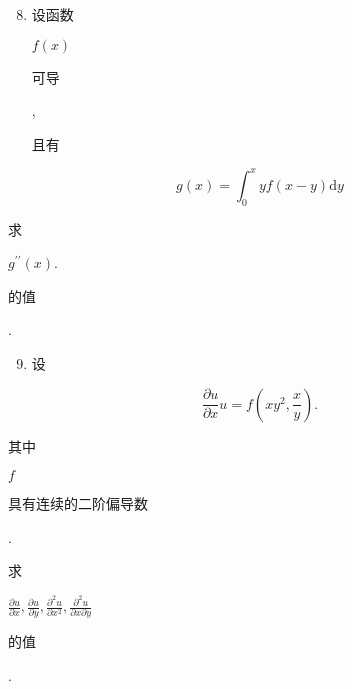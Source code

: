 \documentclass[10pt]{article}
\begin{document}
\begin{enumerate}
  \setcounter{enumi}{7}
  \item \begin{CJK}{UTF8}{mj}设函数\end{CJK} $f(x)$ \begin{CJK}{UTF8}{mj}可导\end{CJK}, \begin{CJK}{UTF8}{mj}且有\end{CJK}
\end{enumerate}
$$
g(x)=\int_{0}^{x} y f(x-y) \mathrm{d} y
$$
\begin{CJK}{UTF8}{mj}求\end{CJK} $g^{\prime \prime}(x)$. \begin{CJK}{UTF8}{mj}的值\end{CJK}.

\begin{enumerate}
  \setcounter{enumi}{8}
  \item \begin{CJK}{UTF8}{mj}设\end{CJK}
\end{enumerate}
$$
\frac{\partial u}{\partial x} u=f\left(x y^{2}, \frac{x}{y}\right) .
$$
\begin{CJK}{UTF8}{mj}其中\end{CJK} $f$ \begin{CJK}{UTF8}{mj}具有连续的二阶偏导数\end{CJK}. \begin{CJK}{UTF8}{mj}求\end{CJK} $\frac{\partial u}{\partial x}, \frac{\partial u}{\partial y}, \frac{\partial^{2} u}{\partial x^{2}}, \frac{\partial^{2} u}{\partial x \partial y}$ \begin{CJK}{UTF8}{mj}的值\end{CJK}.
\end{document}
